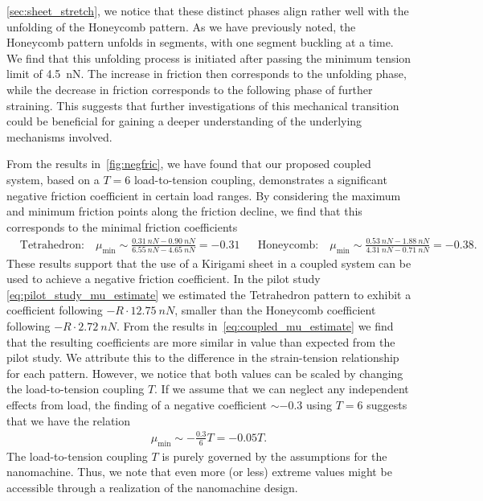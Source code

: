 \cref{sec:sheet_stretch}, we notice that these distinct phases align rather well with the unfolding of the Honeycomb pattern. As we have previously noted, the Honeycomb pattern unfolds in segments, with one segment buckling at a time. We find that this unfolding process is initiated after passing the minimum tension limit of \SI{4.5}{nN}. The increase in friction then corresponds to the unfolding phase, while the decrease in friction corresponds to the following phase of further straining. This suggests that further investigations of this mechanical transition could be beneficial for gaining a deeper understanding of the underlying mechanisms involved. 

From the results in~\cref{fig:negfric}, we have found that our proposed coupled system, based on a $T = 6$ load-to-tension coupling, demonstrates a significant negative friction coefficient in certain load ranges. By considering the
maximum and minimum friction points along the friction decline, we find that this corresponds to the minimal friction coefficients
\begin{align}
  &\text{Tetrahedron:} \quad \mu_{\min} \sim \frac{\SI{0.31}{nN} - \SI{0.90}{nN}}{\SI{6.55}{nN} - \SI{4.65}{nN}} = -0.31& 
  &\text{Honeycomb:} \quad \mu_{\min} \sim \frac{\SI{0.53}{nN} - \SI{1.88}{nN}}{\SI{4.31}{nN} - \SI{0.71}{nN}} = -0.38.&
  \label{eq:coupled_mu_estimate}
\end{align}
These results support that the use of a Kirigami sheet in a coupled system can be used to achieve a negative friction coefficient. In the pilot study \cref{eq:pilot_study_mu_estimate} we estimated the Tetrahedron pattern to exhibit a coefficient following $-R \cdot \SI{12.75}{nN}$, smaller than the Honeycomb coefficient following $-R \cdot \SI{2.72}{nN}$. From the results in~\cref{eq:coupled_mu_estimate} we find that the resulting coefficients are more similar in value than expected from the pilot study. We attribute this to the difference in the strain-tension relationship for each pattern. However, we notice that both values can be scaled by changing the load-to-tension coupling $T$. If we assume that we can neglect any independent effects from load, the finding of a negative coefficient $\sim -0.3$ using $T=6$ suggests that we have the relation 
\begin{align*}
  \mu_{\min} \sim - \frac{0.3}{6} T = - 0.05 T.
\end{align*}
The load-to-tension coupling $T$ is purely governed by the assumptions for the nanomachine. Thus, we note that even more (or less) extreme values might be accessible through a realization of the nanomachine design.



